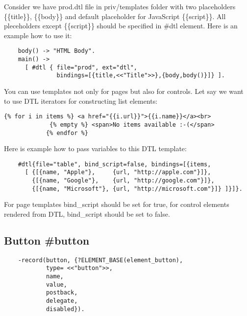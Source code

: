 Consider we have prod.dtl file in priv/templates folder with two
placeholders \{\{title\}\}, \{\{body\}\} and default placeholder for JavaScript \{\{script\}\}.
All pleceholders except \{\{script\}\} should be specified in \#dtl element.
Here is an example how to use it:

\vspace{1\baselineskip}
\begin{lstlisting}
    body() -> "HTML Body".
    main() ->
      [ #dtl { file="prod", ext="dtl",
               bindings=[{title,<<"Title">>},{body,body()}]} ].
\end{lstlisting}
\vspace{1\baselineskip}

You can use templates not only for pages but also for controls. Let say we want
to use DTL iterators for constructing list elements:

\vspace{1\baselineskip}
\begin{lstlisting}[caption=table.html]
    {% for i in items %} <a href="{{i.url}}">{{i.name}}</a><br>
             {% empty %} <span>No items available :-(</span>
            {% endfor %}
\end{lstlisting}
\vspace{1\baselineskip}

Here is example how to pass variables to this DTL template:

\vspace{1\baselineskip}
\begin{lstlisting}
    #dtl{file="table", bind_script=false, bindings=[{items,
      [ {[{name, "Apple"},     {url, "http://apple.com"}]},
        {[{name, "Google"},    {url, "http://google.com"}]},
        {[{name, "Microsoft"}, {url, "http://microsoft.com"}]} ]}]}.
\end{lstlisting}
\vspace{1\baselineskip}

For page templates bind\_script should be set for true, for control elements rendered from DTL,
bind\_script should be set to false.

\subsection{Button {\bf \#button}}

\vspace{1\baselineskip}
\begin{lstlisting}
    -record(button, {?ELEMENT_BASE(element_button),
            type= <<"button">>,
            name,
            value,
            postback,
            delegate,
            disabled}).
\end{lstlisting}
\vspace{1\baselineskip}

